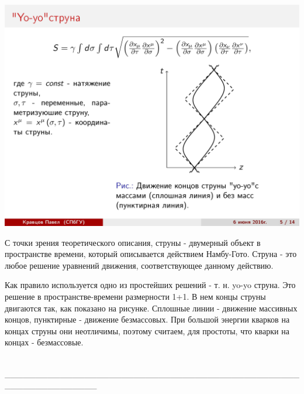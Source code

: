 \documentclass[14pt]{article}
\renewcommand{\line}{\\ \_\_\_\_\_\_\_\_\_\_\_\_\_\_\_\_\_\_\_\_\_\_\_\_\_\_\_\_\_\_\_\_\_\_\_\_\_\_\_\_\_\_\_\_\_\_\_\_\_\_\_\_\_\_\_\_\_\_\_\_\_\_\_ \\ }
\begin{document}
\begin{minipage}[h]{0.5\linewidth}
\includegraphics[width=1\linewidth]{page-05.jpg}
\end{minipage}
\begin{minipage}[h]{0.45\linewidth}
С точки зрения теоретического описания, струны - двумерный объект в пространстве времени, который описывается действием Намбу-Гото. Струна - это любое решение уравнений движения, соответствующее данному действию.

Как правило используется одно из простейших решений - т. н. yo-yo струна. Это решение в пространстве-времени размерности 1+1. В нем концы струны двигаются так, как показано на рисунке. Сплошные линии - движение массивных концов, пунктирные - движение безмассовых. При большой энергии кварков на концах струны они неотличимы, поэтому считаем, для простоты, что кварки на концах - безмассовые.
\end{minipage}
\line
\end{document}
